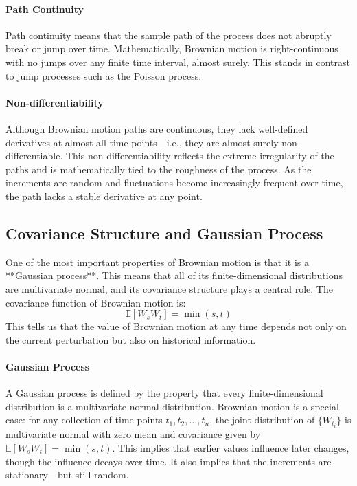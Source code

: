 \documentclass{article}
\begin{document}
\paragraph{Path Continuity}
Path continuity means that the sample path of the process does not abruptly break or jump over time. Mathematically, Brownian motion is right-continuous with no jumps over any finite time interval, almost surely. This stands in contrast to jump processes such as the Poisson process.

\paragraph{Non-differentiability}
Although Brownian motion paths are continuous, they lack well-defined derivatives at almost all time points—i.e., they are almost surely non-differentiable. This non-differentiability reflects the extreme irregularity of the paths and is mathematically tied to the roughness of the process. As the increments are random and fluctuations become increasingly frequent over time, the path lacks a stable derivative at any point.

\subsection{Covariance Structure and Gaussian Process}

One of the most important properties of Brownian motion is that it is a **Gaussian process**. This means that all of its finite-dimensional distributions are multivariate normal, and its covariance structure plays a central role. The covariance function of Brownian motion is:
\[
\mathbb{E}[W_s W_t] = \min(s, t)
\]
This tells us that the value of Brownian motion at any time depends not only on the current perturbation but also on historical information.

\paragraph{Gaussian Process}
A Gaussian process is defined by the property that every finite-dimensional distribution is a multivariate normal distribution. Brownian motion is a special case: for any collection of time points $t_1, t_2, \dots, t_n$, the joint distribution of $\{W_{t_i}\}$ is multivariate normal with zero mean and covariance given by $\mathbb{E}[W_s W_t] = \min(s, t)$. This implies that earlier values influence later changes, though the influence decays over time. It also implies that the increments are stationary—but still random.
\end{document}
